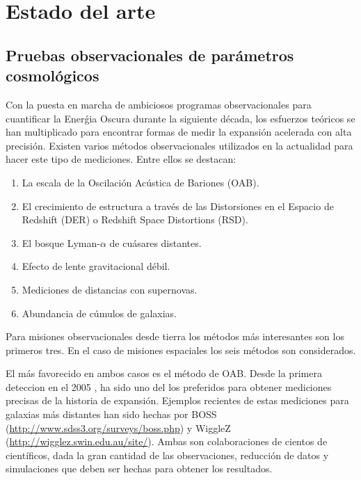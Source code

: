 
\section{Estado del arte}

\subsection{Pruebas observacionales de par\'ametros cosmol\'ogicos}
Con la puesta en marcha de ambiciosos programas observacionales para
cuantificar la Ener\'gia Oscura durante la siguiente d\'ecada, los
esfuerzos te\'oricos se han  multiplicado para encontrar formas de
medir la expansi\'on acelerada con alta precisi\'on. 
Existen varios
m\'etodos observacionales utilizados en la actualidad para hacer este
tipo de mediciones. Entre ellos se destacan:

\begin{enumerate}
\item La escala de la Oscilaci\'on Ac\'ustica de Bariones (OAB).
\item El crecimiento de estructura a trav\'es de las Distorsiones en
  el Espacio de Redshift (DER) o Redshift Space Distortions (RSD).
\item El bosque Lyman-$\alpha$ de cuásares distantes.
\item Efecto de lente gravitacional d\'ebil.
\item Mediciones de distancias con supernovas.
\item Abundancia de c\'umulos de galaxias.
\end{enumerate}

Para misiones observacionales desde tierra los m\'etodos m\'as interesantes 
son los primeros tres. En el caso de misiones espaciales
los seis m\'etodos son considerados.

El más favorecido en ambos casos es el m\'etodo de OAB. 
Desde la primera deteccion en el 2005 \cite{Eisenstein2005},
ha sido uno del los preferidos para obtener mediciones precisas de la
historia de expansi\'on. Ejemplos recientes de estas mediciones
\cite{wigglez,BOSS} para
galaxias m\'as distantes han sido hechas por BOSS
(\url{http://www.sdss3.org/surveys/boss.php}) y WiggleZ
(\url{http://wigglez.swin.edu.au/site/}). Ambas son colaboraciones de
cientos de cient\'ificos, dada la gran cantidad de las observaciones,
reducci\'on de datos y simulaciones que deben ser hechas para obtener
los resultados.

